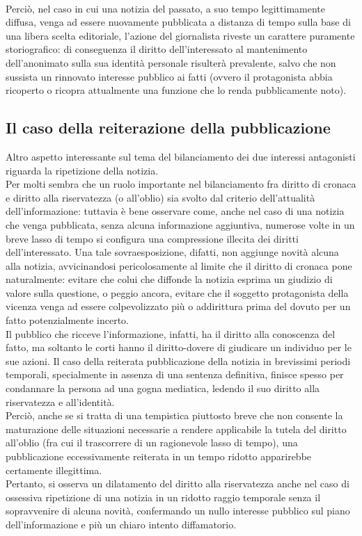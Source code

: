 \\Perciò, nel caso in cui una notizia del passato, a suo tempo legittimamente diffusa, venga ad essere nuovamente pubblicata a distanza di tempo sulla base di una libera scelta editoriale, l'azione del giornalista riveste un carattere puramente storiografico: di conseguenza il diritto dell'interessato al mantenimento dell'anonimato sulla sua identità personale risulterà prevalente, salvo che non sussista un rinnovato interesse pubblico ai fatti (ovvero il protagonista abbia ricoperto o ricopra attualmente una funzione che lo renda pubblicamente noto).

\subsection{Il caso della reiterazione della pubblicazione}
Altro aspetto interessante sul tema del bilanciamento dei due interessi antagonisti riguarda la ripetizione della notizia.
\\Per molti sembra che un ruolo importante nel bilanciamento fra diritto di cronaca e diritto alla riservatezza (o all'oblio) sia svolto dal criterio dell'attualità dell'informazione: tuttavia è bene osservare come, anche nel caso di una notizia che venga pubblicata, senza alcuna informazione aggiuntiva, numerose volte in un breve lasso di tempo si configura una compressione illecita dei diritti dell'interessato.
Una tale sovraesposizione, difatti, non aggiunge novità alcuna alla notizia, avvicinandosi pericolosamente al limite che il diritto di cronaca pone naturalmente: evitare che colui che diffonde la notizia esprima un giudizio di valore sulla questione, o peggio ancora, evitare che il soggetto protagonista della vicenza venga ad essere colpevolizzato più o addirittura prima del dovuto per un fatto potenzialmente incerto.
\\Il pubblico che ricceve l'informazione, infatti, ha il diritto alla conoscenza del fatto, ma soltanto le corti hanno il diritto-dovere di giudicare un individuo per le sue azioni.
Il caso della reiterata pubblicazione della notizia in brevissimi periodi temporali, specialmente in assenza di una sentenza definitiva, finisce spesso per condannare la persona ad una gogna mediatica, ledendo il suo diritto alla riservatezza e all'identità.
\\Perciò, anche se si tratta di una tempistica piuttosto breve che non consente la maturazione delle situazioni necessarie a rendere applicabile la tutela del diritto all'oblio (fra cui il trascorrere di un ragionevole lasso di tempo), una pubblicazione eccessivamente reiterata in un tempo ridotto apparirebbe certamente illegittima.
\\Pertanto, si osserva un dilatamento del diritto alla riservatezza anche nel caso di ossessiva ripetizione di una notizia in un ridotto raggio temporale senza il sopravvenire di alcuna novità, confermando un nullo interesse pubblico sul piano dell'informazione e più un chiaro intento diffamatorio. 


